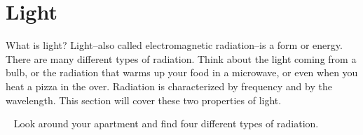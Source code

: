 \documentclass[main.tex]{subfiles}
\begin{document}
\section{Light}
What is light? Light--also called electromagnetic radiation--is a form or energy. There are many different types of radiation. Think about the light coming from a bulb, or the radiation that warms up your food in a microwave, or even when you heat a pizza in the over. Radiation is characterized by frequency and by the wavelength. This section will cover these two properties of light.
  \begin{marginfigure}
\begin{tcolorbox}[enhanced,colback=red!5!white,colframe=black!50!red,boxrule=1pt,
  arc=0pt,outer arc=0pt,drop heavy lifted shadow]
\faGears\ 
 Look around your apartment and find four different types of radiation.\end{tcolorbox}
 \end{marginfigure}
\sloppy
\end{document}
